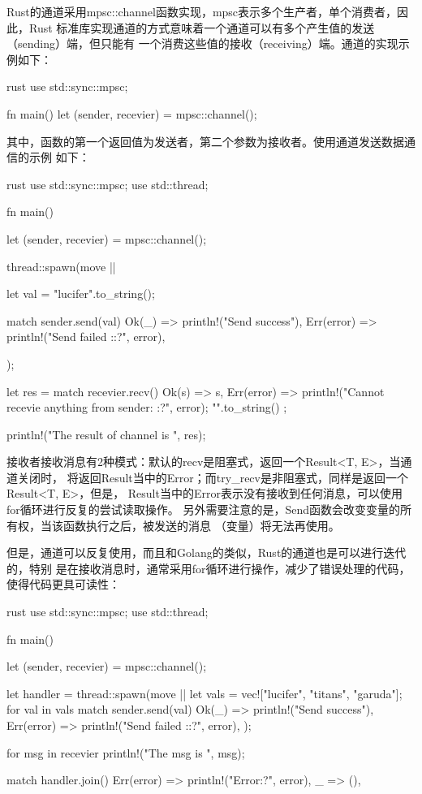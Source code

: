 Rust的通道采用mpsc::channel函数实现，mpsc表示多个生产者，单个消费者，因此，Rust
标准库实现通道的方式意味着一个通道可以有多个产生值的发送（sending）端，但只能有
一个消费这些值的接收（receiving）端。通道的实现示例如下：
\begin{code-block}{rust}
use std::sync::mpsc;

fn main() {
    let (sender, recevier) = mpsc::channel();
}
\end{code-block}
其中，函数的第一个返回值为发送者，第二个参数为接收者。使用通道发送数据通信的示例
如下：
\begin{code-block}{rust}
use std::sync::mpsc;
use std::thread;

fn main() {
    let (sender, recevier) = mpsc::channel();

    thread::spawn(move || {
        let val = "lucifer".to_string();

        match sender.send(val) {
            Ok(_) => println!("Send success"),
            Err(error) => println!("Send failed :{:?}", error),
        }
    });

    let res = match recevier.recv() {
        Ok(s) => s,
        Err(error) => {
            println!("Cannot recevie anything from sender: {:?}", error);
            "".to_string()
        }
    };

    println!("The result of channel is {}", res);
}
\end{code-block}
接收者接收消息有2种模式：默认的recv是阻塞式，返回一个Result<T, E>，当通道关闭时，
将返回Result当中的Error；而try\_recv是非阻塞式，同样是返回一个Result<T, E>，但是，
Result当中的Error表示没有接收到任何消息，可以使用for循环进行反复的尝试读取操作。
另外需要注意的是，Send函数会改变变量的所有权，当该函数执行之后，被发送的消息
（变量）将无法再使用。

但是，通道可以反复使用，而且和Golang的类似，Rust的通道也是可以进行迭代的，特别
是在接收消息时，通常采用for循环进行操作，减少了错误处理的代码，使得代码更具可读性：
\begin{code-block}{rust}
use std::sync::mpsc;
use std::thread;

fn main() {
    let (sender, recevier) = mpsc::channel();

    let handler = thread::spawn(move || {
        let vals = vec!["lucifer", "titans", "garuda"];
        for val in vals {
            match sender.send(val) {
                Ok(_) => println!("Send success"),
                Err(error) => println!("Send failed :{:?}", error),
            }
        }
    });

    for msg in recevier {
        println!("The msg is {}", msg);
    }

    match handler.join() {
        Err(error) => println!("Error{:?}", error),
        _ => (),
    }
}
\end{code-block}


